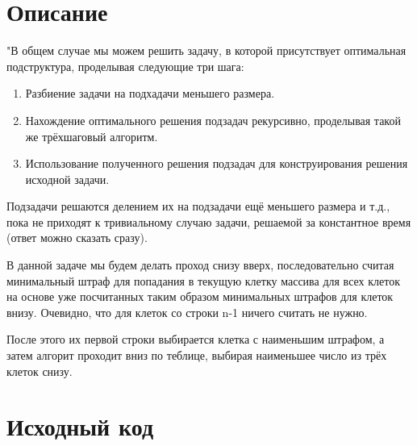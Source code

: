 \section{Описание}

"В общем случае мы можем решить задачу, в которой присутствует оптимальная подструктура, проделывая следующие три шага:

\begin{enumerate}
	\item Разбиение задачи на подхадачи меньшего размера.
	\item Нахождение оптимального решения подзадач рекурсивно, проделывая такой же трёхшаговый алгоритм.
	\item Использование полученного решения подзадач для конструирования решения исходной задачи.
\end{enumerate}

\vspace{\baselineskip}

Подзадачи решаются делением их на подзадачи ещё меньшего размера и т.д., пока не приходят к тривиальному случаю задачи, решаемой за константное время (ответ можно сказать сразу).

\vspace{\baselineskip}
В данной задаче мы будем делать проход снизу вверх, последовательно считая минимальный штраф для попадания в текущую клетку массива для всех клеток на основе уже посчитанных таким образом минимальных штрафов для клеток внизу. Очевидно, что для клеток со строки n-1 ничего считать не нужно.  

После этого их первой строки выбирается клетка с наименьшим штрафом, а затем алгорит проходит вниз по теблице, выбирая наименьшее число из трёх клеток снизу.

\pagebreak

\section{Исходный код}

\vspace{\baselineskip}

